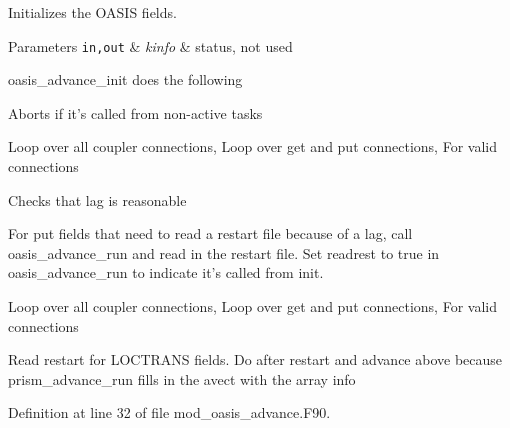 Initializes the O\+A\+S\+I\+S fields. 


\begin{DoxyParams}[1]{Parameters}
\mbox{\tt in,out}  & {\em kinfo} & status, not used \\
\hline
\end{DoxyParams}
oasis\+\_\+advance\+\_\+init does the following
\begin{DoxyItemize}
\item Aborts if it's called from non-\/active tasks
\item Loop over all coupler connections, Loop over get and put connections, For valid connections
\begin{DoxyItemize}
\item Checks that lag is reasonable
\item For put fields that need to read a restart file because of a lag, call oasis\+\_\+advance\+\_\+run and read in the restart file. Set readrest to true in oasis\+\_\+advance\+\_\+run to indicate it's called from init.
\end{DoxyItemize}
\item Loop over all coupler connections, Loop over get and put connections, For valid connections
\begin{DoxyItemize}
\item Read restart for L\+O\+C\+T\+R\+A\+N\+S fields. Do after restart and advance above because prism\+\_\+advance\+\_\+run fills in the avect with the array info 
\end{DoxyItemize}
\end{DoxyItemize}

Definition at line 32 of file mod\+\_\+oasis\+\_\+advance.\+F90.

